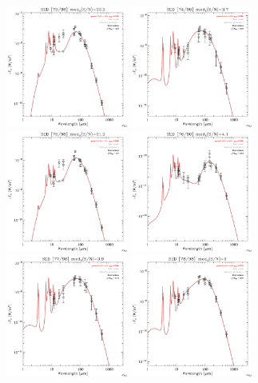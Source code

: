 \documentclass[preprint2,longabstract]{aastex}
\begin{document}
\begin{figure}
    \includegraphics[trim=0 2mm 0 0, clip, width=40mm]{../SEDs/sed_73.pdf}
	\includegraphics[trim=0 2mm 0 0, clip, width=40mm]{../SEDs/sed_74.pdf}
	\includegraphics[trim=0 2mm 0 0, clip, width=40mm]{../SEDs/sed_75.pdf}
	\includegraphics[trim=0 2mm 0 0, clip, width=40mm]{../SEDs/sed_76.pdf}
	\includegraphics[trim=0 2mm 0 0, clip, width=40mm]{../SEDs/sed_77.pdf}
	\includegraphics[trim=0 2mm 0 0, clip, width=40mm]{../SEDs/sed_78.pdf}

\end{figure}
\end{document}
